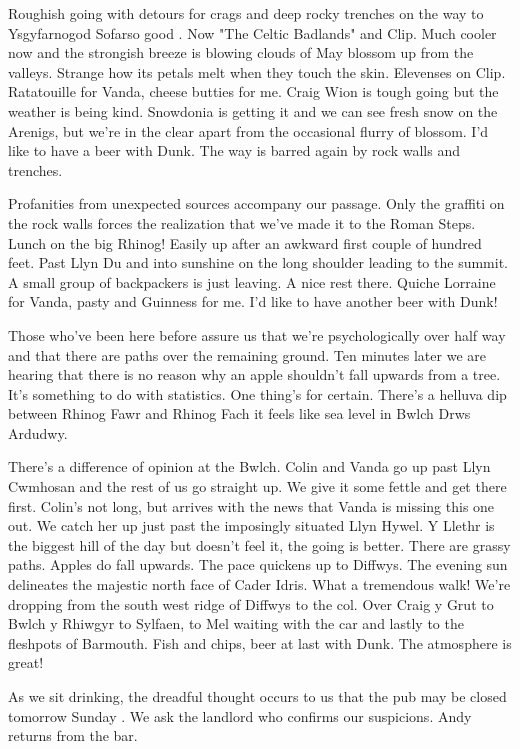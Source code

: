 \documentclass[a5paper,openany,font 10pt]{scrbook}
\begin{document}
Roughish going with detours for crags and deep rocky trenches on
the way to Ysgyfarnogod  Sofarso good . Now "The Celtic Badlands"
and Clip. Much cooler now and the strongish breeze is blowing
clouds of May blossom up from the valleys. Strange how its petals
melt when they touch the skin. Elevenses on Clip. Ratatouille for
Vanda, cheese butties for me. Craig Wion is tough going but the
weather is being kind. Snowdonia is getting it and we can see
fresh snow on the Arenigs, but we're in the clear apart from the
occasional flurry of blossom. I'd like to have a beer with Dunk.
The way is barred again by rock walls and trenches.

Profanities from unexpected sources accompany our passage. Only
the graffiti on the rock walls forces the realization that we've
made it to the Roman Steps. Lunch on the big Rhinog! Easily up
after an awkward first couple of hundred feet. Past Llyn Du and
into sunshine on the long shoulder leading to the summit. A small
group of backpackers is just leaving. A nice rest there. Quiche
Lorraine for Vanda, pasty and Guinness for me. I'd like to have
another beer with Dunk!

Those who've been here before assure us that we're
psychologically over half way and that there are paths over the
remaining ground. Ten minutes later we are hearing that there is
no reason why an apple shouldn't fall upwards from a tree.
It's    something to do with statistics. One thing's for certain. There's
a helluva dip between Rhinog Fawr and Rhinog Fach  it feels like
sea level in Bwlch Drws Ardudwy.

There's a difference of opinion at the Bwlch. Colin and
Vanda go up past Llyn Cwmhosan and the rest of us go straight up.
We give it some fettle and get there first. Colin's not long, but
arrives with the news that Vanda is missing this one out. We
catch her up just past the imposingly situated Llyn Hywel. Y
Llethr is the biggest hill of the day but doesn't feel it, the
going is better. There are grassy paths. Apples do fall upwards.
The pace quickens up to Diffwys. The evening sun delineates the
majestic north face of Cader Idris. What a tremendous walk! We're
dropping from the south west ridge of Diffwys to the col. Over
Craig y Grut to Bwlch y Rhiwgyr to Sylfaen, to Mel waiting with
the car and lastly to the fleshpots of Barmouth. Fish and chips,
beer at last with Dunk. The atmosphere is great!

As we sit drinking, the dreadful thought occurs to us that
the pub may be closed tomorrow  Sunday . We ask the landlord who
confirms our suspicions. Andy returns from the bar.
\end{document}
